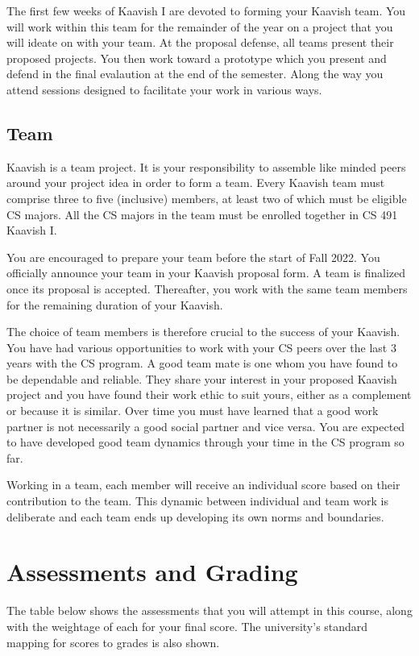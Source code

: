 \documentclass[a4paper]{article}
\newcommand{\new}[1]{{#1}}
\begin{document}
\new{The first few weeks of Kaavish I are devoted to forming your Kaavish team. You will work within this team for the remainder of the year on a project that you will ideate on with your team. At the proposal defense, all teams present their proposed projects. You then work toward a prototype which you present and defend in the final evalaution at the end of the semester. Along the way you attend sessions designed to facilitate your work in various ways.}


\subsection{Team}

Kaavish is a team project. It is your responsibility to assemble like minded peers around your project idea in order to form a team. Every Kaavish team must comprise three to five (inclusive) members, at least two of which must be eligible CS majors. All the CS majors in the team must be enrolled together in CS 491 Kaavish I. 

You are encouraged to prepare your team before the start of Fall 2022. You officially announce your team in your Kaavish proposal form. A team is finalized once its proposal is accepted. Thereafter, you work with the same team members for the remaining duration of your Kaavish.

The choice of team members is therefore crucial to the success of your Kaavish. You have had various opportunities to work with your CS peers over the last 3 years with the CS program. A good team mate is one whom you have found to be dependable and reliable. They share your interest in your proposed Kaavish project and you have found their work ethic to suit yours, either as a complement or because it is similar. Over time you must have learned that a good work partner is not necessarily a good social partner and vice versa. You are expected to have developed good team dynamics through your time in the CS program so far.

Working in a team, each member will receive an individual score based on their contribution to the team. This dynamic between individual and team work is deliberate and each team ends up developing its own norms and boundaries.

\section{Assessments and Grading}

The table below shows the assessments that you will attempt in this course, along with the weightage of each for your final score. The university's standard mapping for scores to grades is also shown.
\end{document}
